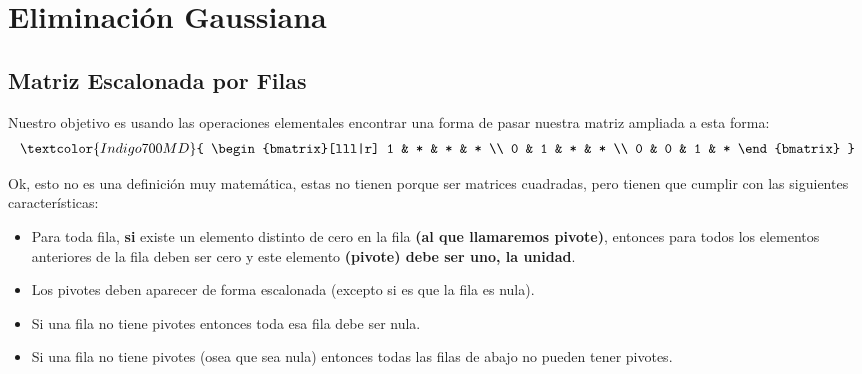 \documentclass[12pt, fleqn]{report}                             %
\theoremstyle{break}                                            %
\begin{document}
        \clearpage
        \section{Eliminación Gaussiana}


            \subsection{Matriz Escalonada por Filas}

                Nuestro objetivo es usando las operaciones elementales encontrar una
                forma de pasar nuestra matriz ampliada a esta forma:
                \begin{align*}
                    \textcolor{Indigo700MD}{
                        \begin{bmatrix}[lll|r]
                            1 & * & * & * \\
                            0 & 1 & * & * \\
                            0 & 0 & 1 & * 
                        \end{bmatrix}
                    }
                \end{align*}

                Ok, esto no es una definición muy matemática, estas no tienen porque
                ser matrices cuadradas, pero tienen que cumplir con las siguientes
                características:
                \begin{itemize}
                    \item 
                        Para toda fila, \textbf{si} existe un elemento distinto de cero en la fila
                        \textbf{(al que llamaremos pivote)}, entonces para todos los
                        elementos anteriores  de la fila deben ser cero y este elemento
                        \textbf{(pivote) debe ser uno, la unidad}.
                    \item
                        Los pivotes deben aparecer de forma escalonada (excepto si es que la
                        fila es nula).
                    \item
                        Si una fila no tiene pivotes entonces toda esa fila debe ser nula.
                    \item
                        Si una fila no tiene pivotes (osea que sea nula) entonces todas
                        las filas de abajo no pueden tener pivotes.
                \end{itemize}
\end{document}
